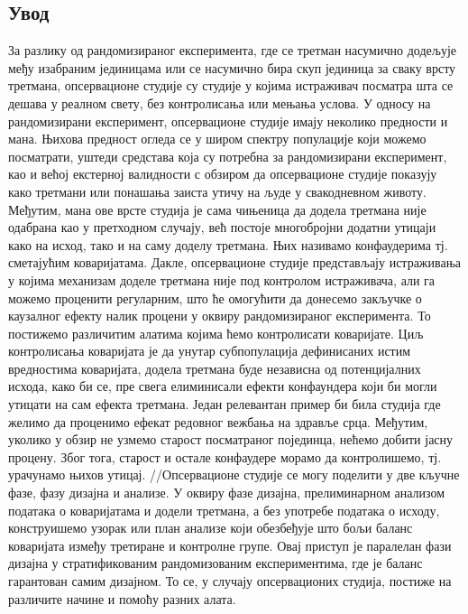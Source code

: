 \documentclass[12pt, a4paper]{article}
\begin{document}
\subsection{Увод}
За разлику од рандомизираног експеримента, где се третман насумично додељује међу изабраним јединицама или се насумично бира скуп јединица за сваку врсту третмана, опсервационе студије су студије у којима истраживач посматра шта се дешава у реалном свету, без контролисања или мењања услова. У односу на рандомизирани експеримент, опсервационе студије имају неколико предности и мана. Њихова предност огледа се у широм спектру популације који можемо посматрати, уштеди средстава која су потребна за рандомизирани експеримент, као и већој екстерној валидности с обзиром да опсервационе студије показују како третмани или понашања заиста утичу на људе у свакодневном животу. Међутим, мана ове врсте студија је сама чињеница да додела третмана није одабрана као у претходном случају, већ постоје многобројни додатни утицаји како на исход, тако и на саму доделу третмана. Њих називамо конфаудерима тј. сметајућим коваријатама.  Дакле, опсервационе студије представљају истраживања у којима механизам доделе третмана није под контролом истраживача, али га можемо проценити регуларним, што ће омогућити да донесемо закључке о каузалног ефекту налик процени у оквиру рандомизираног експеримента. То постижемо различитим алатима којима ћемо контролисати коваријате. Циљ контролисања коваријата је да унутар субпопулација дефинисаних истим вредностима коваријата, додела третмана буде независна од потенцијалних исхода, како би се, пре свега елиминисали ефекти конфаундера који би могли утицати на сам ефекта третмана.
Један релевантан пример би била студија где желимо да проценимо ефекат редовног вежбања на здравље срца. Међутим, уколико у обзир не узмемо старост посматраног појединца, нећемо добити јасну процену. Због тога, старост и остале конфаудере морамо да контролишемо, тј. урачунамо њихов утицај. 
//Опсервационе студије се могу поделити у две кључне фазе, фазу дизајна и анализе. У оквиру фазе дизајна, прелиминарном анализом података о коваријатама и додели третмана, а без употребе података о исходу, конструишемо узорак или план анализе који обезбеђује што бољи баланс коваријата између третиране и контролне групе. Овај приступ је паралелан фази дизајна у стратификованим рандомизованим експериментима, где је баланс гарантован самим дизајном. То се, у случају опсервационих студија, постиже на различите начине и помоћу разних алата. 
\end{document}
